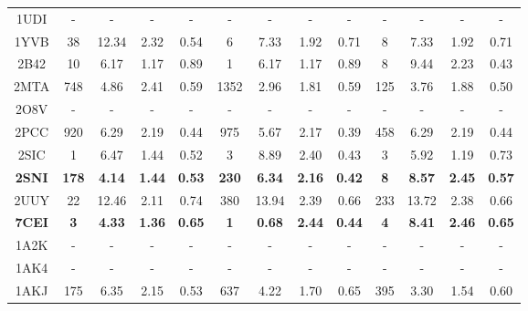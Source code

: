 \begin{longtable}{c c c c c|c c c c|c c c c}
 {\tiny 1UDI} &{\tiny -}&{\tiny -}&{\tiny -}&{\tiny -} &{\tiny -}&{\tiny -}&{\tiny -}&{\tiny -} &{\tiny -}&{\tiny -}&{\tiny -}&{\tiny -}\\ 
 {\tiny 1YVB} &{\tiny 38}&{\tiny 12.34}&{\tiny 2.32}&{\tiny 0.54} &{\tiny 6}&{\tiny 7.33}&{\tiny 1.92}&{\tiny 0.71} &{\tiny 8}&{\tiny 7.33}&{\tiny 1.92}&{\tiny 0.71}\\ 
 {\tiny 2B42} &{\tiny 10}&{\tiny 6.17}&{\tiny 1.17}&{\tiny 0.89} &{\tiny 1}&{\tiny 6.17}&{\tiny 1.17}&{\tiny 0.89} &{\tiny 8}&{\tiny 9.44}&{\tiny 2.23}&{\tiny 0.43}\\ 
 {\tiny 2MTA} &{\tiny 748}&{\tiny 4.86}&{\tiny 2.41}&{\tiny 0.59} &{\tiny 1352}&{\tiny 2.96}&{\tiny 1.81}&{\tiny 0.59} &{\tiny 125}&{\tiny 3.76}&{\tiny 1.88}&{\tiny 0.50}\\ 
 {\tiny 2O8V} &{\tiny -}&{\tiny -}&{\tiny -}&{\tiny -} &{\tiny -}&{\tiny -}&{\tiny -}&{\tiny -} &{\tiny -}&{\tiny -}&{\tiny -}&{\tiny -}\\ 
 {\tiny 2PCC} &{\tiny 920}&{\tiny 6.29}&{\tiny 2.19}&{\tiny 0.44} &{\tiny 975}&{\tiny 5.67}&{\tiny 2.17}&{\tiny 0.39} &{\tiny 458}&{\tiny 6.29}&{\tiny 2.19}&{\tiny 0.44}\\ 
 {\tiny 2SIC} &{\tiny 1}&{\tiny 6.47}&{\tiny 1.44}&{\tiny 0.52} &{\tiny 3}&{\tiny 8.89}&{\tiny 2.40}&{\tiny 0.43} &{\tiny 3}&{\tiny 5.92}&{\tiny 1.19}&{\tiny 0.73}\\ 
 \textbf{\tiny 2SNI} &\textbf{\tiny 178}&\textbf{\tiny 4.14}&\textbf{\tiny 1.44}&\textbf{\tiny 0.53} &\textbf{\tiny 230}&\textbf{\tiny 6.34}&\textbf{\tiny 2.16}&\textbf{\tiny 0.42} &\textbf{\tiny 8}&\textbf{\tiny 8.57}&\textbf{\tiny 2.45}&\textbf{\tiny 0.57}\\ 
 {\tiny 2UUY} &{\tiny 22}&{\tiny 12.46}&{\tiny 2.11}&{\tiny 0.74} &{\tiny 380}&{\tiny 13.94}&{\tiny 2.39}&{\tiny 0.66} &{\tiny 233}&{\tiny 13.72}&{\tiny 2.38}&{\tiny 0.66}\\ 
 \textbf{\tiny 7CEI} &\textbf{\tiny 3}&\textbf{\tiny 4.33}&\textbf{\tiny 1.36}&\textbf{\tiny 0.65} &\textbf{\tiny 1}&\textbf{\tiny 0.68}&\textbf{\tiny 2.44}&\textbf{\tiny 0.44} &\textbf{\tiny 4}&\textbf{\tiny 8.41}&\textbf{\tiny 2.46}&\textbf{\tiny 0.65}\\ 
 {\tiny 1A2K} &{\tiny -}&{\tiny -}&{\tiny -}&{\tiny -} &{\tiny -}&{\tiny -}&{\tiny -}&{\tiny -} &{\tiny -}&{\tiny -}&{\tiny -}&{\tiny -}\\ 
 {\tiny 1AK4} &{\tiny -}&{\tiny -}&{\tiny -}&{\tiny -} &{\tiny -}&{\tiny -}&{\tiny -}&{\tiny -} &{\tiny -}&{\tiny -}&{\tiny -}&{\tiny -}\\ 
 {\tiny 1AKJ} &{\tiny 175}&{\tiny 6.35}&{\tiny 2.15}&{\tiny 0.53} &{\tiny 637}&{\tiny 4.22}&{\tiny 1.70}&{\tiny 0.65} &{\tiny 395}&{\tiny 3.30}&{\tiny 1.54}&{\tiny 0.60}\\ 

\end{longtable}
